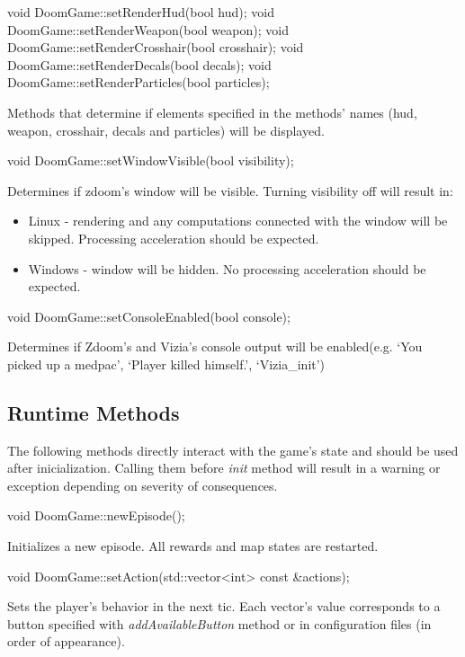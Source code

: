 \vspace{20pt}
\begin{clinee}       
void DoomGame::setRenderHud(bool hud);
void DoomGame::setRenderWeapon(bool weapon);
void DoomGame::setRenderCrosshair(bool crosshair);
void DoomGame::setRenderDecals(bool decals);
void DoomGame::setRenderParticles(bool particles);
\end{clinee}
	Methods that determine if elements specified in the methods' names (hud, weapon, crosshair, decals and particles) will be displayed.


\vspace{20pt}
\begin{clinee}
void DoomGame::setWindowVisible(bool visibility);
\end{clinee}
	Determines if zdoom's window will be visible.
	Turning visibility off will result in:
	\begin{itemize}
		\item Linux - rendering and any computations connected with the window will be skipped. Processing acceleration should be expected.
		\item Windows - window will be hidden. No processing acceleration should be expected.
	\end{itemize}


\vspace{20pt}
\begin{clinee}
void DoomGame::setConsoleEnabled(bool console);
\end{clinee}
	Determines if Zdoom's and Vizia's console output will be enabled(e.g. `You picked up a medpac', `Player killed himself.', `Vizia\_init')


\vspace{20pt}
\subsection{Runtime Methods}\label{subsec:runtime_methods}
	The following methods directly interact with the game's state and should be used after inicialization. Calling them before \emph{init} method will result in a warning or exception depending on severity of consequences. 

\vspace{20pt}
\begin{clinee}
void DoomGame::newEpisode();
\end{clinee}
	Initializes a new episode. All rewards and map states are restarted.


\vspace{20pt}
\begin{clinee}
	void DoomGame::setAction(std::vector<int> const &actions);
\end{clinee}
	Sets the player's behavior in the next tic.
	Each vector's value corresponds to a button specified with \emph{addAvailableButton} method or in configuration files (in order of appearance).

